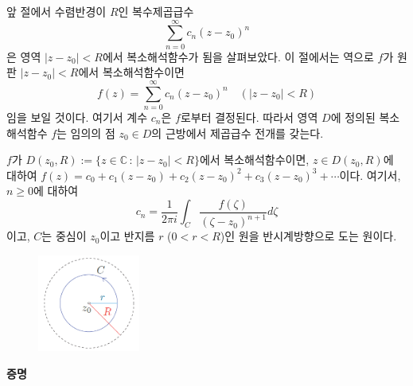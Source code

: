 앞 절에서 수렴반경이 $R$인 복수제곱급수
\[
\sum_{n=0}^\infty c_n(z-z_0)^n
\]
은 영역 $|z-z_0|<R$에서 복소해석함수가 됨을 살펴보았다.
이 절에서는 역으로 $f$가 원판 $|z-z_0|<R$에서 복소해석함수이면
\[
f(z) = \sum_{n=0}^\infty c_n (z-z_0)^n \quad (|z-z_0|<R)
\]
임을 보일 것이다. 여기서 계수 $c_n$은 $f$로부터 결정된다.
따라서 영역 $D$에 정의된 복소해석함수 $f$는 임의의 점 $z_0\in D$의 근방에서
제곱급수 전개를 갖는다.

\begin{salttheorem} {}{} \label{thm-4-4}
$f$가 $D(z_0,R) := \{ z\in \mathbb C \,:\, |z-z_0| <R \}$에서 복소해석함수이면,
$z\in D(z_0,R)$에 대하여
$f(z) = c_0 + c_1(z-z_0) + c_2(z-z_0)^2 + c_3(z-z_0)^3+ \cdots$이다.
여기서, $n\ge0$에 대하여
\[
c_n = \dfrac1{2\pi i} \int_C \dfrac{f(\zeta)}{(\zeta-z_0)^{n+1}} d\zeta
\]
이고, $C$는 중심이 $z_0$이고 반지름 $r$ ($0<r<R$)인 원을 반시계방향으로 도는 원이다.
\end{salttheorem}

\begin{figure}[h!]
\begin{center}
\includegraphics[width=0.3\textwidth]{./SaltChapter/fig-4-0-4}
\end{center}
\end{figure}

{\bf 증명}

